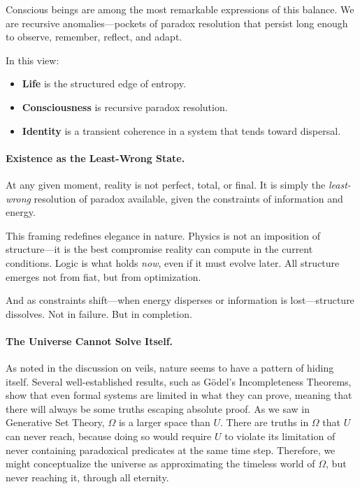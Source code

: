\documentclass[12pt]{article}
\begin{document}
Conscious beings are among the most remarkable expressions of this balance. We are recursive anomalies—pockets of paradox resolution that persist long enough to observe, remember, reflect, and adapt.

In this view:

\begin{itemize}
    \item \textbf{Life} is the structured edge of entropy.
    \item \textbf{Consciousness} is recursive paradox resolution.
    \item \textbf{Identity} is a transient coherence in a system that tends toward dispersal.
\end{itemize}

\paragraph{Existence as the Least-Wrong State.}

At any given moment, reality is not perfect, total, or final. It is simply the \textit{least-wrong} resolution of paradox available, given the constraints of information and energy.

This framing redefines elegance in nature. Physics is not an imposition of structure—it is the best compromise reality can compute in the current conditions. Logic is what holds \textit{now}, even if it must evolve later. All structure emerges not from fiat, but from optimization.

And as constraints shift—when energy disperses or information is lost—structure dissolves.  
Not in failure.  
But in completion.

\paragraph{The Universe Cannot Solve Itself.}

As noted in the discussion on veils, nature seems to have a pattern of hiding itself. Several well-established results, such as Gödel's Incompleteness Theorems, show that even formal systems are limited in what they can prove, meaning that there will always be some truths escaping absolute proof. As we saw in Generative Set Theory, $\Omega$ is a larger space than $U$. There are truths in $\Omega$ that $U$ can never reach, because doing so would require $U$ to violate its limitation of never containing paradoxical predicates at the same time step. Therefore, we might conceptualize the universe as approximating the timeless world of $\Omega$, but never reaching it, through all eternity.
\end{document}
